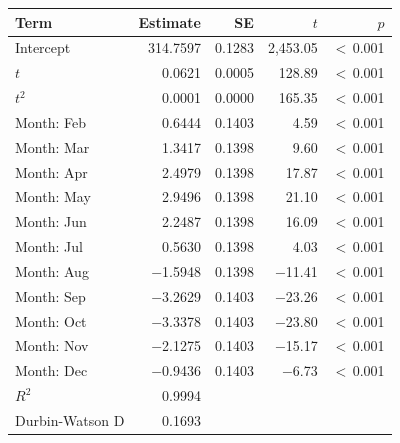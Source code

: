 \begin{tabular}{lrrrr}
\toprule
Term & Estimate & SE & $t$ & $p$\\
\midrule
Intercept & 314.7597 & 0.1283 & 2,453.05 & $<$\,0.001\\
$t$ & 0.0621 & 0.0005 & 128.89 & $<$\,0.001\\
$t^2$ & 0.0001 & 0.0000 & 165.35 & $<$\,0.001\\
Month: Feb & 0.6444 & 0.1403 & 4.59 & $<$\,0.001\\
Month: Mar & 1.3417 & 0.1398 & 9.60 & $<$\,0.001\\
Month: Apr & 2.4979 & 0.1398 & 17.87 & $<$\,0.001\\
Month: May & 2.9496 & 0.1398 & 21.10 & $<$\,0.001\\
Month: Jun & 2.2487 & 0.1398 & 16.09 & $<$\,0.001\\
Month: Jul & 0.5630 & 0.1398 & 4.03 & $<$\,0.001\\
Month: Aug & $-$1.5948 & 0.1398 & $-$11.41 & $<$\,0.001\\
Month: Sep & $-$3.2629 & 0.1403 & $-$23.26 & $<$\,0.001\\
Month: Oct & $-$3.3378 & 0.1403 & $-$23.80 & $<$\,0.001\\
Month: Nov & $-$2.1275 & 0.1403 & $-$15.17 & $<$\,0.001\\
Month: Dec & $-$0.9436 & 0.1403 & $-$6.73 & $<$\,0.001\\
$R^2$ & 0.9994 &  &  & \\
Durbin-Watson D & 0.1693 &  &  & \\
\bottomrule
\end{tabular}
